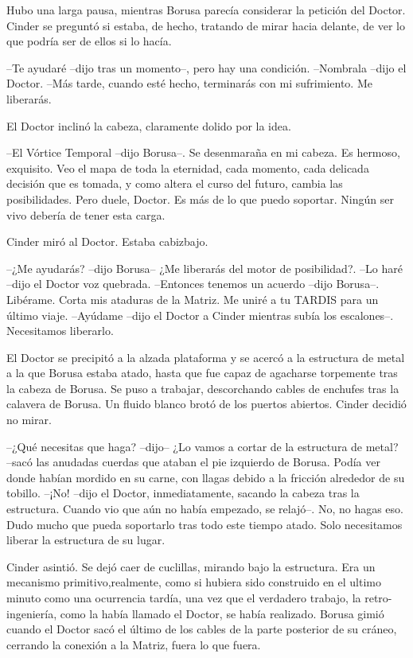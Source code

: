 Hubo una larga pausa, mientras Borusa parecía considerar la petición del Doctor. Cinder se preguntó si estaba, de hecho, tratando de mirar hacia delante, de ver lo que podría ser de ellos si lo hacía.

--Te ayudaré --dijo tras un momento--, pero hay una condición.
--Nombrala --dijo el Doctor.
--Más tarde, cuando esté hecho, terminarás con mi sufrimiento. Me liberarás.

El Doctor inclinó la cabeza, claramente dolido por la idea.

--El Vórtice Temporal --dijo Borusa--. Se desenmaraña en mi cabeza. Es hermoso, exquisito. Veo el mapa de toda la eternidad, cada momento, cada delicada decisión que es tomada, y como altera el curso del futuro, cambia las posibilidades. Pero duele, Doctor. Es más de lo que puedo soportar. Ningún ser vivo debería de tener esta carga.

Cinder miró al Doctor. Estaba cabizbajo.

--¿Me ayudarás? --dijo Borusa-- ¿Me liberarás del motor de posibilidad?.
--Lo haré --dijo el Doctor voz quebrada.
--Entonces tenemos un acuerdo --dijo Borusa--. Libérame. Corta mis ataduras de la Matriz. Me uniré a tu TARDIS para un último viaje.
--Ayúdame --dijo el Doctor a Cinder mientras subía los escalones--. Necesitamos liberarlo.

El Doctor se precipitó a la alzada plataforma y se acercó a la estructura de metal a la que Borusa estaba atado, hasta que fue capaz de agacharse torpemente tras la cabeza de Borusa. Se puso a trabajar, descorchando cables de enchufes tras la calavera de Borusa. Un fluido blanco brotó de los puertos abiertos. Cinder decidió no mirar.

--¿Qué necesitas que haga? --dijo-- ¿Lo vamos a cortar de la estructura de metal? --sacó las anudadas cuerdas que ataban el pie izquierdo de Borusa. Podía ver donde habían mordido en su carne, con llagas debido a la fricción alrededor de su tobillo.
--¡No! --dijo el Doctor, inmediatamente, sacando la cabeza tras la estructura. Cuando vio que aún no había empezado, se relajó--. No, no hagas eso. Dudo mucho que pueda soportarlo tras todo este tiempo atado. Solo necesitamos liberar la estructura de su lugar.

Cinder asintió. Se dejó caer de cuclillas, mirando bajo la estructura. Era un mecanismo primitivo,realmente, como si hubiera sido construido en el ultimo minuto como una ocurrencia tardía, una vez que el verdadero trabajo, la retro-ingeniería, como la había llamado el Doctor, se había realizado.
Borusa gimió cuando el Doctor sacó el último de los cables de la parte posterior de su cráneo, cerrando la conexión a la Matriz, fuera lo que fuera. 

